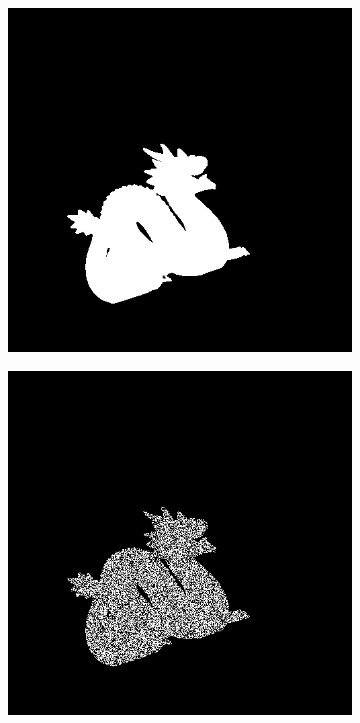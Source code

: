 \documentclass[border=15pt, multi, tikz]{article}
\begin{document}
\begin{figure}[H]
	
	\begin{subfigure}[b]{0.20\linewidth}
		\includegraphics[width=\linewidth]{./Figures/test_scenes/05113.depth0.png}
	\end{subfigure}
	\begin{subfigure}[b]{0.20\linewidth}
		\includegraphics[width=\linewidth]{./Figures/test_scenes/05113.depth0_noise.png}

\end{subfigure}
\end{figure}
\end{document}
